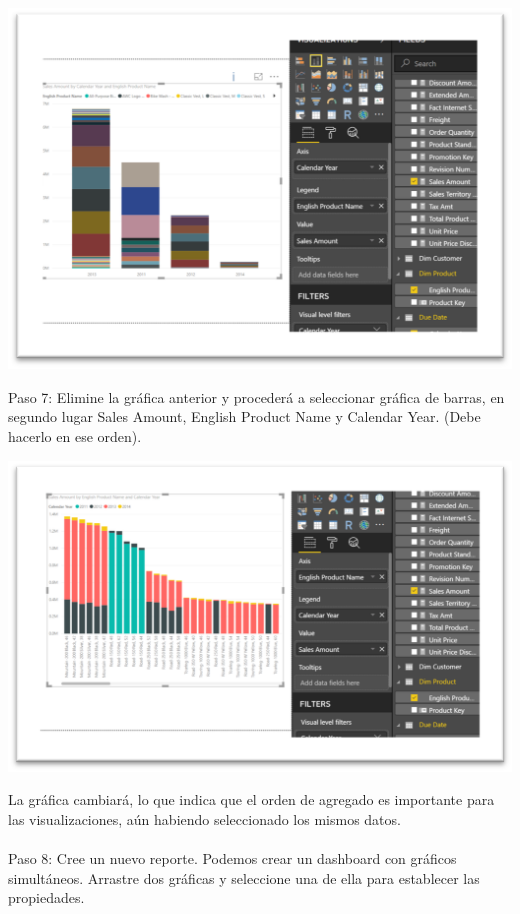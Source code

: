 \documentclass[12pt,letterpaper]{article}
\begin{document}
\begin{center}
    \includegraphics[width=16cm]{img/7.png}  
\end{center}
Paso 7: Elimine la gráfica anterior y procederá a seleccionar gráfica de barras, en segundo lugar Sales Amount, English Product Name y Calendar Year. (Debe hacerlo en ese orden).
\begin{center}
    \includegraphics[width=16cm]{img/8.png}  
\end{center}
La gráfica cambiará, lo que indica que el orden de agregado es importante para las visualizaciones, aún habiendo seleccionado los mismos datos.
\\\\
Paso 8: Cree un nuevo reporte.
Podemos crear un dashboard con gráficos simultáneos. Arrastre dos gráficas y seleccione una de ella para establecer las propiedades.
\end{document}
